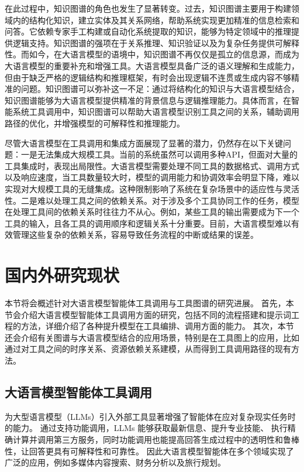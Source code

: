 在此过程中，知识图谱的角色也发生了显著转变。过去，知识图谱主要用于构建领域内的结构化知识，建立实体及其关系网络，帮助系统实现更加精准的信息检索和问答。它依赖专家手工构建或自动化系统提取的知识，能够为特定领域中的推理提供逻辑支持。知识图谱的强项在于关系推理、知识验证以及为复杂任务提供可解释性。而如今，在大语言模型的语境中，知识图谱不再仅仅是孤立的信息源，而成为大语言模型的重要补充和增强工具。大语言模型具备广泛的语义理解和生成能力，但由于缺乏严格的逻辑结构和推理框架，有时会出现逻辑不连贯或生成内容不够精准的问题。知识图谱可以弥补这一不足：通过将结构化的知识与大语言模型结合，知识图谱能够为大语言模型提供精准的背景信息与逻辑推理能力。具体而言，在智能系统工具调用中，知识图谱可以帮助大语言模型识别工具之间的关系，辅助调用路径的优化，并增强模型的可解释性和推理能力。

尽管大语言模型在工具调用和集成方面展现了显著的潜力，仍然存在以下关键问题：一是无法集成大规模工具。当前的系统虽然可以调用多种API，但面对大量的工具集成时，表现出局限性。大语言模型需要处理不同工具的数据格式、调用方式以及响应速度，当工具数量较大时，模型的调用能力和协调效率会明显下降，难以实现对大规模工具的无缝集成。这种限制影响了系统在复杂场景中的适应性与灵活性。二是难以处理工具之间的依赖关系。对于涉及多个工具协同工作的任务，模型在处理工具间的依赖关系时往往力不从心。例如，某些工具的输出需要成为下一个工具的输入，且各工具的调用顺序和逻辑关系十分重要。目前，大语言模型难以有效管理这些复杂的依赖关系，容易导致任务流程的中断或结果的误差。



\section{国内外研究现状}

本节将会概述针对大语言模型智能体工具调用与工具图谱的研究进展。
首先，本节会介绍大语言模型智能体工具调用方面的研究，包括不同的流程搭建和提示词工程的方法，详细介绍了各种提升模型在工具编排、调用方面的能力。
其次，本节还会介绍有关图谱与大语言模型结合的应用场景，特别是在工具图上的应用，比如通过对工具之间的时序关系、资源依赖关系建模，从而得到工具调用路径的现有方法。

\subsection{大语言模型智能体工具调用}

为大型语言模型（LLMs）引入外部工具显著增强了智能体在应对复杂现实任务时的能力\cite{huang2024planning, Qin2023, qu2024tool}。
通过支持功能调用，LLMs 能够获取最新信息、提升专业技能、
执行精确计算并调用第三方服务，同时功能调用也能提高回答生成过程中的透明性和鲁棒性，让回答更具有可解释性和可靠性。
因此大语言模型智能体在多个领域实现了广泛的应用，例如多媒体内容搜索\cite{Song2023}、财务分析\cite{theuma2024equipping}以及旅行规划\cite{hao2024large}。

